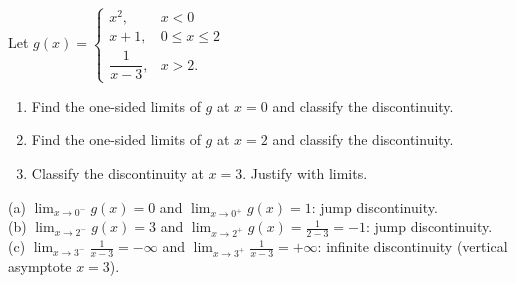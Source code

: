 \begin{exo}{}
Let $g(x)=\begin{cases}x^2, & x<0\\ x+1, & 0\le x\le2\\ \dfrac{1}{x-3}, & x>2.\end{cases}$
\begin{enumerate}[label=(\alph*)]
\item Find the one-sided limits of $g$ at $x=0$ and classify the discontinuity.
\item Find the one-sided limits of $g$ at $x=2$ and classify the discontinuity.
\item Classify the discontinuity at $x=3$. Justify with limits.
\end{enumerate}
\begin{solution}
(a) $\lim_{x\to0^-}g(x)=0$ and $\lim_{x\to0^+}g(x)=1$: jump discontinuity.\\
(b) $\lim_{x\to2^-}g(x)=3$ and $\lim_{x\to2^+}g(x)=\frac{1}{2-3}=-1$: jump discontinuity.\\
(c) $\lim_{x\to3^-}\frac{1}{x-3}=-\infty$ and $\lim_{x\to3^+}\frac1{x-3}=+\infty$: infinite discontinuity (vertical asymptote $x=3$).
\end{solution}
\end{exo}

